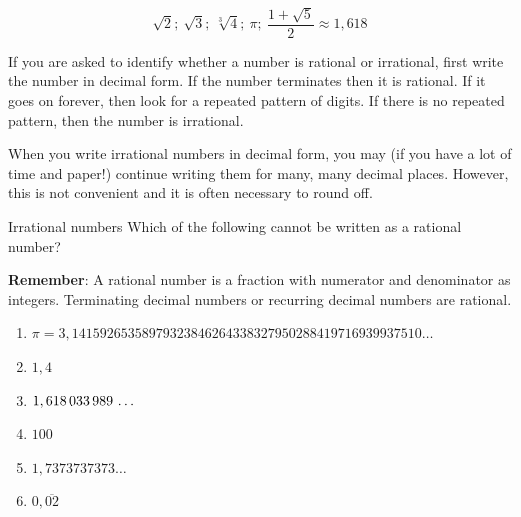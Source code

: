 \begin{equation*}
\sqrt{2};~\sqrt{3};~\sqrt[3]{4};~\pi ;
~\frac{1+\sqrt{5}}{2}\approx 1,618
\end{equation*}


\label{m38349*notfhsst!!!underscore!!!id128}
\par
\label{m38349*id324739}If you are asked to identify whether a number is rational or irrational, first write the number in decimal form. If the number terminates then it is rational. If it goes on forever, then look for a repeated pattern of digits. If there is no repeated pattern, then the number is irrational.\par 
\label{m38349*id324745}When you write irrational numbers in decimal form, you may (if you have a lot of time and paper!) continue writing them for many, many decimal places. However, this is not convenient and it is often necessary to round off.\par 
\label{m38349*secfhsst!!!underscore!!!id133}


\begin{activity}{Irrational numbers }
\nopagebreak
\label{m38349*id324757}Which of the following cannot be
written as a rational number?\par \vspace{0.5cm}
\label{m38349*id324763}\textbf{Remember}: A rational number is a fraction with numerator and denominator as integers. Terminating decimal numbers or recurring decimal numbers are rational.\par 
\label{m38349*id324775}\begin{enumerate}[itemsep=5pt, label=\textbf{\arabic*}. ] 
\label{m38349*uid1}\item 
$\pi =3,14159265358979323846264338327950288419716939937510\ldots$
\label{m38349*uid2}\item $1,4$
\label{m38349*uid3}\item 
$1,618\phantom{\rule{0.166667em}{0ex}}033\phantom{\rule{0.166667em}{0ex}}989\phantom{\rule{0.166667em}{0ex}}\ldots$
\label{m38349*uid4}\item $100$
\item $1,7373737373\ldots$
\item $0,\overline{02}$
\end{enumerate}
\end{activity}


